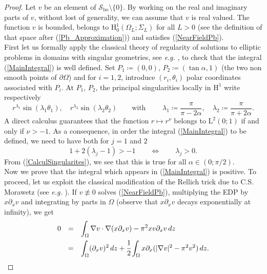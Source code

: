 \documentclass[11pt,a4paper]{article}
\newcommand{\dsp}{\displaystyle}
\newcommand{\Om}{\Omega}
\newcommand{\mrm}[1]{\mathrm{#1}}
\newcommand{\mL}{\mrm{L}}
\newcommand{\mH}{\mrm{H}}
\newcommand{\mX}{\mathscr{S}}
\begin{document}
\begin{proof}
Let $v$ be an element of $\mX_{\mrm{bo}}\setminus\{0\}$. By working on the real and imaginary parts of $v$, without lost of generality, we can assume that $v$ is real valued. The function $v$ is bounded, belongs to $\mH^1_0(\Om_L;\Sigma_L)$ for all $L>0$ (see the definition of that space after (\ref{Pb_Approximation})) and satisfies (\ref{NearFieldPb}).\\
\newline
First let us formally apply the classical theory of regularity of solutions to elliptic problems in domains with singular geometries, see \textit{e.g.} \cite{Kond67,KoMR97}, to check that the integral (\ref{MainIntegral}) is well defined. 
Set $P_1\coloneqq(0,0)$, $P_2\coloneqq(\tan\alpha,1)$ (the two non smooth points of $\partial\Om$) and for $i=1,2$, introduce $(r_i,\theta_i)$ polar coordinates associated with $P_i$. At $P_1$, $P_2$, the principal singularities locally in $\mH^1$ write respectively
\begin{equation}\label{CalculSingularites}
r^{\lambda_1}\sin(\lambda_1\theta_1),\quad r^{\lambda_2}\sin(\lambda_2\theta_2)\qquad\mbox{with }\qquad\lambda_1\coloneqq\frac{\pi}{\pi-2\alpha},\quad \lambda_2\coloneqq\frac{\pi}{\pi+2\alpha}.
\end{equation}
A direct calculus guarantees that the function $r\mapsto r^{\nu}$ belongs to $\mL^2(0;1)$ if and only if $\nu>-1$. As a consequence, in order the integral (\ref{MainIntegral}) to be defined, we need to have both for $j=1$ and $2$
\[
1+2(\lambda_j-1)>-1\qquad\Leftrightarrow\qquad \lambda_j>0.
\]
From (\ref{CalculSingularites}), we see that this is true for all $\alpha\in(0;\pi/2)$.\\
Now we prove that the integral which appears in (\ref{MainIntegral}) is positive. To proceed, let us exploit the classical modification of the Rellich trick \cite{Rell43} due to C.S. Morawetz (see \textit{e.g.} \cite{MoLu68}). If $v\not\equiv0$ solves (\ref{NearFieldPb}), multiplying the EDP by $x\partial_xv$
and integrating by parts in $\Om$ (observe that $x\partial_xv$ decays exponentially at infinity), we get
\begin{equation}\label{Relation0}
\begin{array}{rcl}
0&=&\dsp\int_{\Om}\nabla v\cdot\nabla(x\partial_xv)-\pi^2xv\partial_xv\,dz\\[8pt]
&=&\dsp\int_{\Om}(\partial_xv)^2\,dz+\cfrac{1}{2}\int_{\Om}x\partial_x(|\nabla v|^2-\pi^2v^2)\,dz.
\end{array}
\end{equation}

\end{proof}
\end{document}
